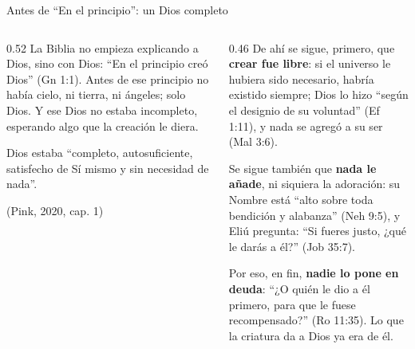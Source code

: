 \documentclass[hyperref={bookmarks=false},aspectratio=169]{beamer}
\begin{document}
\begin{frame}{Antes de ``En el principio'': un Dios completo}
\begin{columns}[t,onlytextwidth]
\begin{column}{0.52\textwidth}\small
La Biblia no empieza explicando a Dios, sino con Dios: ``En el principio creó Dios'' (Gn 1:1). Antes de ese principio no había cielo, ni tierra, ni ángeles; solo Dios. Y ese Dios no estaba incompleto, esperando algo que la creación le diera.\par\medskip
\begin{tcolorbox}[colback=papiro,colframe=dorado,boxrule=1pt,arc=3pt]
\centering\small Dios estaba ``completo, autosuficiente, satisfecho de Sí mismo y sin necesidad de nada''.\par
{\scriptsize\color{gris}(Pink, 2020, cap. 1)}
\end{tcolorbox}
\end{column}
\begin{column}{0.46\textwidth}\scriptsize
De ahí se sigue, primero, que \textbf{crear fue libre}: si el universo le hubiera sido necesario, habría existido siempre; Dios lo hizo ``según el designio de su voluntad'' (Ef 1:11), y nada se agregó a su ser (Mal 3:6).\par\smallskip
Se sigue también que \textbf{nada le añade}, ni siquiera la adoración: su Nombre está ``alto sobre toda bendición y alabanza'' (Neh 9:5), y Eliú pregunta: ``Si fueres justo, ¿qué le darás a él?'' (Job 35:7).\par\smallskip
Por eso, en fin, \textbf{nadie lo pone en deuda}: ``¿O quién le dio a él primero, para que le fuese recompensado?'' (Ro 11:35). Lo que la criatura da a Dios ya era de él.
\end{column}
\end{columns}
\end{frame}
\end{document}
